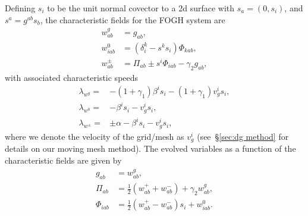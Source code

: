\begin{bibunit}[unsrtnat]
Defining $s_i$ to be the unit normal covector to a 2d surface with
$s_a=(0,s_i)$, and $s^a=g^{ab}s_b$, the characteristic fields for the FOGH
system are~\cite{Lindblom:2005qh}
\begin{eqnarray}
  \label{eq:fosh gh w g}
  w^{g}_{ab} &= g_{ab}, \\
  \label{eq:fosh gh w 0}
  w^{0}_{iab} &= (\delta^k_i-s^k s_i)\Phi_{kab}, \\
  \label{eq:fosh gh w pm}
  w^{\pm}_{ab} &= \Pi_{ab}\pm s^i\Phi_{iab} -\gamma_2 g_{ab},
\end{eqnarray}
with associated characteristic speeds
\begin{eqnarray}
  \label{eq:fosh gh char speed g}
  \lambda_{w^g} =& -(1+\gamma_1)\beta^i s_i -(1+\gamma_1)v^i_g s_i, \\
  \label{eq:fosh gh char speed 0}
  \lambda_{w^0} =& -\beta^i s_i -v^i_g s_i, \\
  \label{eq:fosh gh char speed pm}
  \lambda_{w^\pm} =& \pm \alpha - \beta^i s_i - v^i_g s_i,
\end{eqnarray}
where we denote the velocity of the grid/mesh as $v^i_g$ (see~\S\ref{sec:dg
  method} for details on our moving mesh method). The evolved variables as a
function of the characteristic fields are given by
\begin{eqnarray}
  \label{eq:fosh gh metric from char}
  g_{ab} &= w^g_{ab}, \\
  \label{eq:fosh gh pi from char}
  \Pi_{ab} &= \frac{1}{2}\left(w^+_{ab} + w^-_{ab}\right)+\gamma_2 w^g_{ab}, \\
  \label{eq:fosh gh phi from char}
  \Phi_{iab} &= \frac{1}{2}\left(w^+_{ab} - w^-_{ab}\right)s_i + w^0_{iab}.
\end{eqnarray}


\end{bibunit}
